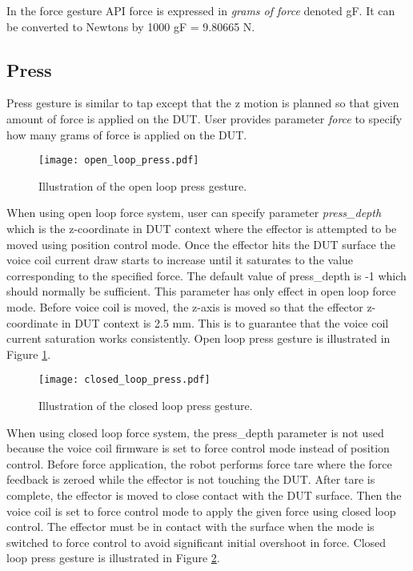 In the force gesture API force is expressed in \emph{grams of force} denoted gF. It can be converted to Newtons by 1000 gF = 9.80665 N.

\subsection{Press}

Press gesture is similar to tap except that the z motion is planned so that given amount of force is applied on the DUT. User provides parameter \emph{force} to specify how many grams of force is applied on the DUT.

\begin{figure}[h]
	\centering
	\texttt{[image: open\_loop\_press.pdf]}
	\caption{Illustration of the open loop press gesture.}
	\label{fig:open_loop_press_gesture}
\end{figure}

When using open loop force system, user can specify parameter \emph{press\_depth} which is the z-coordinate in DUT context where the effector is attempted to be moved using position control mode. Once the effector hits the DUT surface the voice coil current draw starts to increase until it saturates to the value corresponding to the specified force. The default value of press\_depth is -1 which should normally be sufficient. This parameter has only effect in open loop force mode. Before voice coil is moved, the z-axis is moved so that the effector z-coordinate in DUT context is 2.5 mm. This is to guarantee that the voice coil current saturation works consistently. Open loop press gesture is illustrated in Figure \ref{fig:open_loop_press_gesture}.

\begin{figure}[h]
	\centering
	\texttt{[image: closed\_loop\_press.pdf]}
	\caption{Illustration of the closed loop press gesture.}
	\label{fig:closed_loop_press}
\end{figure}

When using closed loop force system, the press\_depth parameter is not used because the voice coil firmware is set to force control mode instead of position control. Before force application, the robot performs force tare where the force feedback is zeroed while the effector is not touching the DUT. After tare is complete, the effector is moved to close contact with the DUT surface. Then the voice coil is set to force control mode to apply the given force using closed loop control. The effector must be in contact with the surface when the mode is switched to force control to avoid significant initial overshoot in force. Closed loop press gesture is illustrated in Figure \ref{fig:closed_loop_press}.

